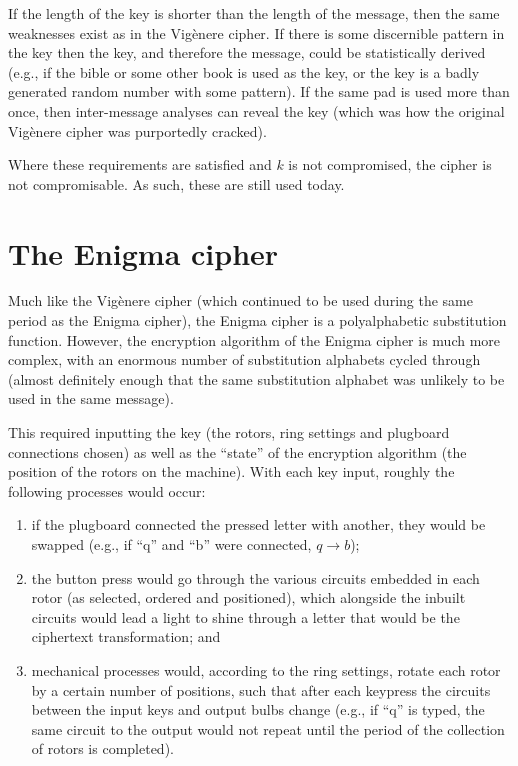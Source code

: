 \documentclass{AIAA}
\begin{document}
If the length of the key is shorter than the length of the message, then the same weaknesses exist as in the Vig\`enere cipher. If there is some discernible pattern in the key then the key, and therefore the message, could be statistically derived (e.g., if the bible or some other book is used as the key, or the key is a badly generated random number with some pattern). If the same pad is used more than once, then inter-message analyses can reveal the key (which was how the original Vig\`enere cipher was purportedly cracked).

Where these requirements are satisfied and $k$ is not compromised, the cipher is not compromisable. As such, these are still used today.

\section{The Enigma cipher}
Much like the Vig\`enere cipher (which continued to be used during the same period as the Enigma cipher), the Enigma cipher is a polyalphabetic substitution function. However, the encryption algorithm of the Enigma cipher is much more complex, with an enormous number of substitution alphabets cycled through (almost definitely enough that the same substitution alphabet was unlikely to be used in the same message). 

This required inputting the key (the rotors, ring settings and plugboard connections chosen) as well as the ``state'' of the encryption algorithm (the position of the rotors on the machine). With each key input, roughly the following processes would occur:

\begin{enumerate}
\item if the plugboard connected the pressed letter with another, they would be swapped (e.g., if ``q'' and ``b'' were connected, $q \longrightarrow b$);
\item the button press would go through the various circuits embedded in each rotor (as selected, ordered and positioned), which alongside the inbuilt circuits would lead a light to shine through a letter that would be the ciphertext transformation; and
\item mechanical processes would, according to the ring settings, rotate each rotor by a certain number of positions, such that after each keypress the circuits between the input keys and output bulbs change (e.g., if ``q'' is typed, the same circuit to the output would not repeat until the period of the collection of rotors is completed).
\end{enumerate}
\end{document}

